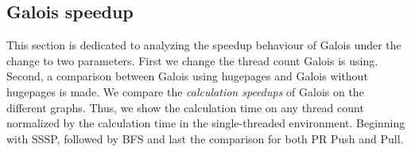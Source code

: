 



\subsection{Galois speedup}
\label{sec:galois_speedup}
This section is dedicated to analyzing the speedup behaviour of Galois under the change to two parameters. First we change the thread count Galois is using. Second, a comparison between Galois using hugepages and Galois without hugepages is made.
We compare the \emph{calculation speedups} of Galois on the different graphs. Thus, we show the calculation time on any thread count normalized by the calculation time in the single-threaded environment.
Beginning with SSSP, followed by BFS and last the comparison for both PR Push and Pull.


